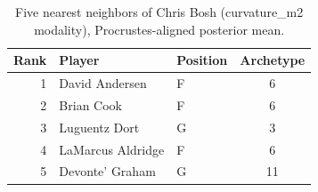\begin{table}[htbp]
  \centering\small
  \begin{tabular}{rllc}
    \toprule
    Rank & Player & Position & Archetype \\
    \midrule
    1 & David Andersen & F & 6 \\
    2 & Brian Cook & F & 6 \\
    3 & Luguentz Dort & G & 3 \\
    4 & LaMarcus Aldridge & F & 6 \\
    5 & Devonte' Graham & G & 11 \\
    \bottomrule
  \end{tabular}
  \caption{Five nearest neighbors of Chris Bosh (curvature_m2 modality), Procrustes-aligned posterior mean.}
  \label{tab:Chris_Bosh_neighbors_curvature_m2}
\end{table}

